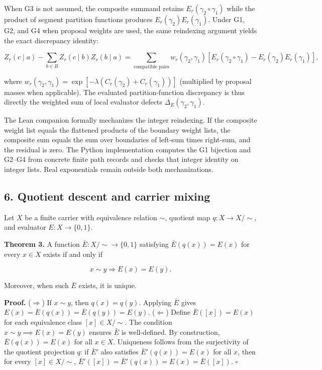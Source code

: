 \documentclass[
  11pt,
]{article}
\theoremstyle{plain}
\theoremstyle{definition}\newtheorem{definition}[theorem]{Definition}
\theoremstyle{remark}\newtheorem*{remark}{Remark}
\begin{document}
When G3 is not assumed, the composite summand retains \(E_r(\gamma_2\circ\gamma_1)\)
while the product of segment partition functions produces \(E_r(\gamma_2)E_r(\gamma_1)\).
Under G1, G2, and G4 when proposal weights are used, the same reindexing argument
yields the exact discrepancy identity:

\[
Z_r(c\mid a)-\sum_{b\in B} Z_r(c\mid b)Z_r(b\mid a) = \sum_{\text{compatible pairs}} w_r(\gamma_2,\gamma_1) \left[ E_r(\gamma_2\circ\gamma_1) - E_r(\gamma_2)E_r(\gamma_1) \right],
\]

where \(w_r(\gamma_2,\gamma_1)=\exp[-\lambda(C_r(\gamma_2)+C_r(\gamma_1))]\) (multiplied
by proposal masses when applicable). The evaluated partition-function discrepancy is
thus directly the weighted sum of local evaluator defects \(\Delta_E(\gamma_2,\gamma_1)\).

The Lean companion formally mechanizes the integer reindexing. If the composite weight list
equals the flattened products of the boundary weight lists, the composite sum
equals the sum over boundaries of left-sum times right-sum, and the residual
is zero. The Python implementation computes the G1 bijection and G2--G4 from
concrete finite path records and checks that integer identity on integer
lists. Real exponentials remain outside both mechanizations.

\subsection{6. Quotient descent and carrier mixing}\label{quotient-descent-and-carrier-mixing}

Let \(X\) be a finite carrier with equivalence relation \(\sim\), quotient map
\(q:X\to X/{\sim}\), and evaluator \(E:X\to\{0,1\}\).

\textbf{Theorem 3.} A function
\(\bar E:X/{\sim}\to\{0,1\}\) satisfying \(\bar E(q(x))=E(x)\) for every \(x\in X\)
exists if and only if

\[
x\sim y\Longrightarrow E(x)=E(y).
\]

Moreover, when such \(\bar E\) exists, it is unique.

\textbf{Proof.} (\(\Longrightarrow\)) If \(x\sim y\), then \(q(x)=q(y)\). Applying \(\bar E\) gives
\(E(x)=\bar E(q(x))=\bar E(q(y))=E(y)\).
(\(\Longleftarrow\)) Define \(\bar E([x])=E(x)\) for each equivalence class \([x]\in X/{\sim}\).
The condition \(x\sim y\implies E(x)=E(y)\) ensures \(\bar E\) is well-defined.
By construction, \(\bar E(q(x))=E(x)\) for all \(x\in X\).
Uniqueness follows from the surjectivity of the quotient projection \(q\):
if \(\bar E'\) also satisfies \(\bar E'(q(x))=E(x)\) for all \(x\), then for every \([x]\in X/{\sim}\), \(\bar E'([x])=\bar E'(q(x))=E(x)=\bar E([x])\). \(\square\)
\end{document}
